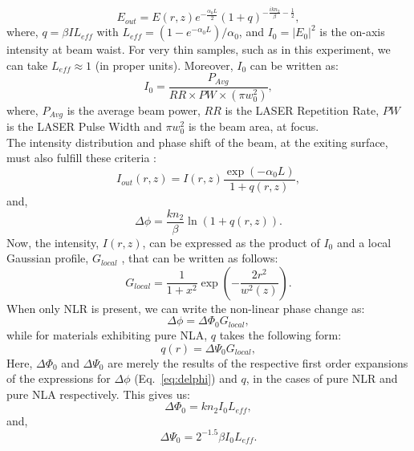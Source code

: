 \documentclass[%
 reprint,
amsmath,
amssymb,
10pt
]{revtex4-2}
\begin{document}
\begin{equation}
    E_{out} = E(r, z)e^{-\frac{\alpha_0 L}{2}}(1 + q)^{-\frac{ikn_2}{\beta} - \frac{1}{2}},
    \label{eq:Eout1}
\end{equation}
where, $q = \beta I L_{eff}$ with $L_{eff} = (1 - e^{-\alpha_0 L}) / \alpha_0$, and $I_0 = |E_0|^2$ is the on-axis intensity at beam waist. For very thin samples, such as in this experiment, we can take $L_{eff} \approx 1$ (in proper units). Moreover, $I_0$ can be written as:
\begin{equation}
    I_0 = \frac{P_{Avg}}{RR\times PW\times(\pi w_0^2)},
    \label{eq:I0}
\end{equation}
where, $P_{Avg}$ is the average beam power, $RR$ is the LASER Repetition Rate, $PW$ is the LASER Pulse Width and $\pi w_0^2$ is the beam area, at focus.\\

The intensity distribution and phase shift of the beam, at the exiting surface, must also fulfill these criteria \cite{calc}:
\begin{equation}
    I_{out}(r, z) = I(r, z)\frac{\exp(-\alpha_0 L)}{1 + q(r, z)},
    \label{eq:IOut}
\end{equation}
and,
\begin{equation}
    \Delta\phi = \frac{kn_2}{\beta}\ln(1 + q(r, z)).
    \label{eq:delphi}
\end{equation}
Now, the intensity, $I(r, z)$, can be expressed as the product of $I_0$ and a local Gaussian profile, $G_{local}$ \cite{calc}, that can be written as follows:
\begin{equation}
    G_{local} = \frac{1}{1 + x^2}\exp\left(-\frac{2r^2}{w^2(z)}\right).
    \label{eq:GLoc}
\end{equation}
When only NLR is present, we can write the non-linear phase change as:
\begin{equation}
    \Delta\phi = \Delta\Phi_0 G_{local},
    \label{eq:delphi2}
\end{equation}
while for materials exhibiting pure NLA, $q$ takes the following form:
\begin{equation}
    q(r) = \Delta\Psi_0 G_{local},
    \label{eq:qq}
\end{equation}
Here, $\Delta\Phi_0$ and $\Delta\Psi_0$ are merely the results of the respective first order expansions of the expressions for $\Delta\phi$ (Eq.~\ref{eq:delphi}) and $q$, in the cases of pure NLR and pure NLA respectively. This gives us:
\begin{equation}
    \boxed{\Delta\Phi_0 = kn_2 I_0 L_{eff}},
    \label{eq:deltaphi}
\end{equation}
and,
\begin{equation}
    \boxed{\Delta\Psi_0 = 2^{-1.5}\beta I_0 L_{eff}}.
    \label{eq:deltapsi}
\end{equation}
\end{document}
